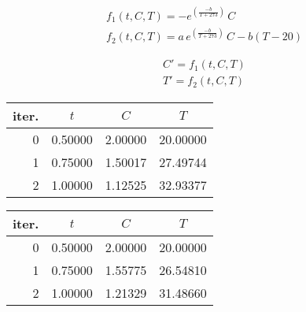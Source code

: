 \setcounter{chapter}{15}
{
\renewcommand{\thesubsection}{\thesection\alph{subsection}}
\begin{center}
\begin{minipage}[c]{0.5\textwidth}
\begin{gather*}
	f_1(t,C,T) = -e^{\left(\frac{-b}{T+273}\right)}\,C\\
	f_2(t,C,T) = a\,e^{\left(\frac{-b}{T+273}\right)}\,C -b(T-20)
\end{gather*}
\end{minipage}%
\begin{minipage}[c]{0.5\textwidth}
\begin{gather*}
	C' = f_1(t,C,T)\\
	T' = f_2(t,C,T)
\end{gather*}
\end{minipage}
\end{center}
%
\begin{center}
\begin{minipage}[c]{0.5\textwidth}
\begin{center}\begin{tabular}{r | c c c}
	iter. & $t$ & $C$ & $T$ \\ \hline
	0     & 0.50000 & 2.00000 & 20.00000 \\
	1     & 0.75000 & 1.50017 & 27.49744 \\
	2     & 1.00000 & 1.12525 & 32.93377
\end{tabular} \end{center}
\end{minipage}%
\begin{minipage}[c]{0.5\textwidth}
\begin{center}\begin{tabular}{r | c c c}
	iter. & $t$ & $C$ & $T$ \\ \hline
	0     & 0.50000 & 2.00000 & 20.00000 \\
	1     & 0.75000 & 1.55775 & 26.54810 \\
	2     & 1.00000 & 1.21329 & 31.48660
\end{tabular} \end{center}
\end{minipage}
\end{center}
\begin{center} \begin{tabular}{ r | c || r | c}

\end{tabular}
\end{center}}
